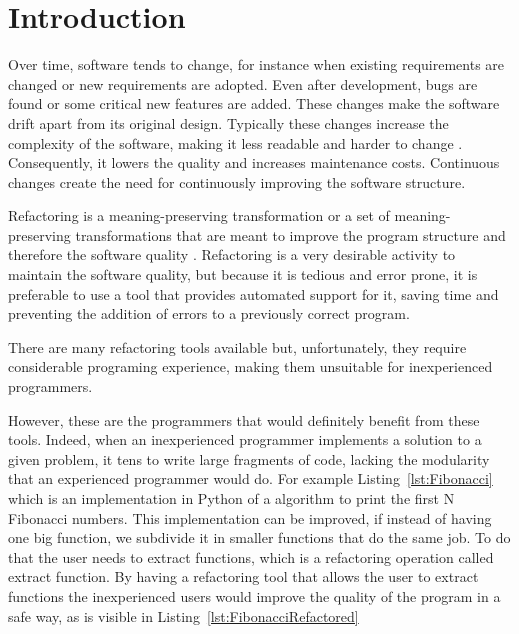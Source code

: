 
% 
% 


\section{Introduction}
\label{sec:Introduction}

Over time, software tends to change, for instance when existing requirements are changed or new requirements are adopted. 
Even after development, bugs are found or some critical new features are added.
These changes make the software drift apart from its original design.
Typically these changes increase the complexity of the software, making it less readable and harder to change \cite{mens2003refactoring}. 
Consequently, it lowers the quality and increases maintenance costs.
Continuous changes create the need for continuously improving the software structure.

Refactoring is a meaning-preserving transformation or a set of meaning-preserving transformations that are meant to improve the program structure and therefore the software quality \cite{bourquin2007high}.
Refactoring is a very desirable activity to maintain the software quality, but because it is tedious and error prone, it is preferable to use a tool that provides automated support for it, saving time and preventing the addition of errors to a previously correct program.

%
There are many refactoring tools available but, unfortunately, they require considerable programing experience, making them unsuitable for inexperienced programmers.

However, these are the programmers that would definitely benefit from these tools.
Indeed, when an inexperienced programmer implements a solution to a given problem, it tens to write large fragments of code, lacking the modularity that an experienced programmer would do.
For example Listing~\ref{lst:Fibonacci} which is an implementation in Python of a algorithm to print the first N Fibonacci numbers.
This implementation can be improved, if instead of having one big function, we subdivide it in smaller functions that do the same job.
To do that the user needs to extract functions, which is a refactoring operation called extract function.
By having a refactoring tool that allows the user to extract functions the inexperienced users would improve the quality of the program in a safe way, as is visible in Listing~\ref{lst:FibonacciRefactored}



